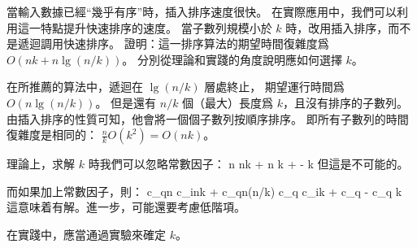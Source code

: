 \startEXERCISE
當輸入數據已經“幾乎有序”時，插入排序速度很快。
在實際應用中，我們可以利用這一特點提升快速排序的速度。
當子數列規模小於 $k$ 時，改用插入排序，而不是遞迴調用快速排序。
證明：這一排序算法的期望時間復雜度爲 $O(nk+n\lg(n/k))$。
分別從理論和實踐的角度說明應如何選擇 $k$。
\stopEXERCISE

\startANSWER
在所推薦的算法中，遞迴在 $\lg(n/k)$ 層處終止，
期望運行時間爲 $O(n\lg(n/k))$。
但是還有 $n/k$ 個（最大）長度爲 $k$，且沒有排序的子數列。
由插入排序的性質可知，他會將一個個子數列按順序排序。
即所有子數列的時間復雜度是相同的： $\frac{n}{k}O(k^2)=O(nk)$。

理論上，求解 $k$ 時我們可以忽略常數因子：
\startsplitformula\startmathalignment[n=1]
\NC n \ge nk + n \NR
\NC \Downarrow \NR
\NC {} \ge k +  -  \NR
\NC \Downarrow \NR
\NC {} \ge k \NR
\stopmathalignment\stopsplitformula
但這是不可能的。

而如果加上常數因子，則：
\startsplitformula\startmathalignment[n=1]
\NC c_qn \ge c_ink + c_qn\lg(n/k) \NR
\NC \Downarrow \NR
\NC c_q \ge c_ik + c_q - c_q \NR
\NC \Downarrow \NR
\NC {} \ge {}k \NR
\stopmathalignment\stopsplitformula
這意味着有解。進一步，可能還要考慮低階項。

在實踐中，應當通過實驗來確定 $k$。
\stopANSWER
